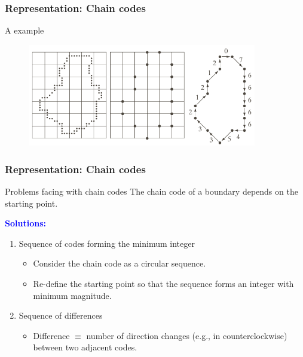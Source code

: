 \documentclass[english,11pt,table,handout]{beamer}
\begin{document}
\frame
{
	\frametitle{Representation: Chain codes}
	\begin{block}{A example}

	\end{block}

	\begin{figure}[!h]
		\includegraphics[width=10cm]{chaincode_2.png}
	\end{figure}
}

\frame
{
	\frametitle{Representation: Chain codes}
	\begin{alertblock}{Problems facing with chain codes}
		{
			\large
			The chain code of a boundary depends on the starting point.
		}
		
		\textbf{\textcolor{blue}{Solutions:}}
		\begin{enumerate}
			\item Sequence of codes forming the minimum integer 
			\begin{itemize}
					\item Consider the chain code as a circular sequence.
					\item Re-define the starting point so that the sequence forms an integer with minimum magnitude.
					
			\end{itemize}
			\item Sequence of differences
			 \begin{itemize}
			 	\item Difference $\equiv$ number of direction changes (e.g., in counterclockwise) between two adjacent codes.
			 \end{itemize}
		\end{enumerate}
		
	\end{alertblock}

	
}
\end{document}
